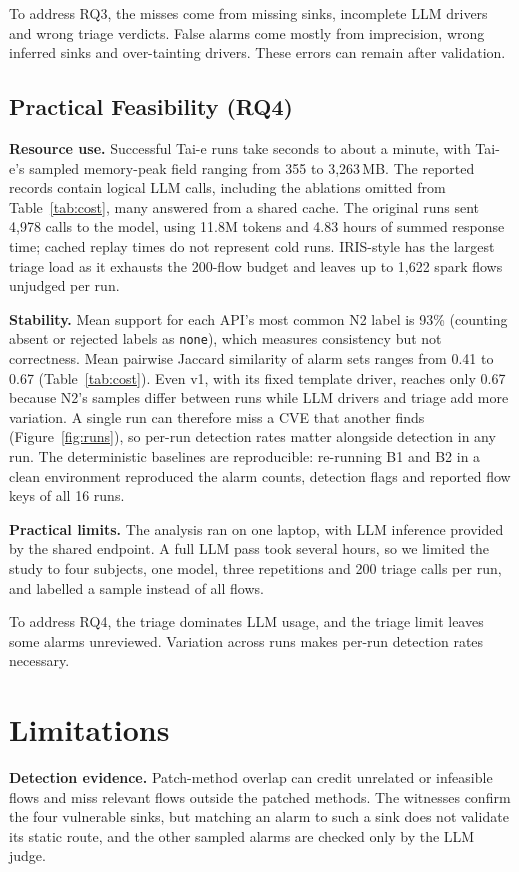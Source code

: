 \documentclass[sigconf]{acmart}
\begin{document}
To address RQ3, the misses come from missing sinks, incomplete LLM drivers and wrong triage verdicts. False alarms come mostly from imprecision, wrong inferred sinks and over-tainting drivers. These errors can remain after validation.

\subsection{Practical Feasibility (RQ4)}
\textbf{Resource use.} Successful Tai-e runs take seconds to about a minute, with Tai-e's sampled memory-peak field ranging from 355 to 3,263\,MB. The reported records contain \TotalCalls{} logical LLM calls, including the ablations omitted from Table~\ref{tab:cost}, many answered from a shared cache. The original runs sent 4,978 calls to the model, using 11.8M tokens and 4.83 hours of summed response time; cached replay times do not represent cold runs. IRIS-style has the largest triage load as it exhausts the 200-flow budget and leaves up to 1,622 spark flows unjudged per run.

\textbf{Stability.} Mean support for each API's most common N2 label is 93\% (counting absent or rejected labels as \texttt{none}), which measures consistency but not correctness. Mean pairwise Jaccard similarity of alarm sets ranges from 0.41 to 0.67 (Table~\ref{tab:cost}). Even v1, with its fixed template driver, reaches only 0.67 because N2's samples differ between runs while LLM drivers and triage add more variation. A single run can therefore miss a CVE that another finds (Figure~\ref{fig:runs}), so per-run detection rates matter alongside detection in any run. The deterministic baselines are reproducible: re-running B1 and B2 in a clean environment reproduced the alarm counts, detection flags and reported flow keys of all 16 runs.

\textbf{Practical limits.} The analysis ran on one laptop, with LLM inference provided by the shared endpoint. A full LLM pass took several hours, so we limited the study to four subjects, one model, three repetitions and 200 triage calls per run, and labelled a sample instead of all \NumFlows{} flows.

To address RQ4, the triage dominates LLM usage, and the triage limit leaves some alarms unreviewed. Variation across runs makes per-run detection rates necessary.

\section{Limitations}
\label{sec:limits}
\textbf{Detection evidence.} Patch-method overlap can credit unrelated or infeasible flows and miss relevant flows outside the patched methods. The witnesses confirm the four vulnerable sinks, but matching an alarm to such a sink does not validate its static route, and the other sampled alarms are checked only by the LLM judge.
\end{document}
